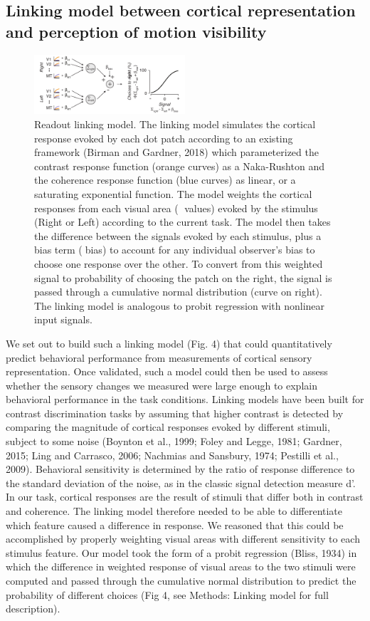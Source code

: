 \documentclass{report}
\begin{document}
\subsection{Linking model between cortical representation and perception of motion visibility}

\begin{figure}
\centering
\includegraphics[keepaspectratio,width=0.5\textwidth]{figs_c2/Fig4_linkingmodel.pdf}
\caption[Readout linking model]{Readout linking model. The linking model simulates the cortical response evoked by each dot patch according to an existing framework (Birman and Gardner, 2018) which parameterized the contrast response function (orange curves) as a Naka-Rushton and the coherence response function (blue curves) as linear, or a saturating exponential function. The model weights the cortical responses from each visual area ( values) evoked by the stimulus (Right or Left) according to the current task. The model then takes the difference between the signals evoked by each stimulus, plus a bias term (bias) to account for any individual observer’s bias to choose one response over the other. To convert from this weighted signal to probability of choosing the patch on the right, the signal is passed through a cumulative normal distribution (curve on right). The linking model is analogous to probit regression with nonlinear input signals.}
\label{fig:c4f4}
\end{figure}

We set out to build such a linking model (Fig. 4) that could quantitatively predict behavioral performance from measurements of cortical sensory representation. Once validated, such a model could then be used to assess whether the sensory changes we measured were large enough to explain behavioral performance in the task conditions. Linking models have been built for contrast discrimination tasks by assuming that higher contrast is detected by comparing the magnitude of cortical responses evoked by different stimuli, subject to some noise (Boynton et al., 1999; Foley and Legge, 1981; Gardner, 2015; Ling and Carrasco, 2006; Nachmias and Sansbury, 1974; Pestilli et al., 2009). Behavioral sensitivity is determined by the ratio of response difference to the standard deviation of the noise, as in the classic signal detection measure d’. In our task, cortical responses are the result of stimuli that differ both in contrast and coherence. The linking model therefore needed to be able to differentiate which feature caused a difference in response. We reasoned that this could be accomplished by properly weighting visual areas with different sensitivity to each stimulus feature. Our model took the form of a probit regression (Bliss, 1934) in which the difference in weighted response of visual areas to the two stimuli were computed and passed through the cumulative normal distribution to predict the probability of different choices (Fig 4, see Methods: Linking model for full description).
\end{document}
